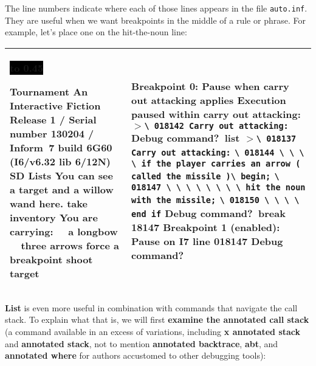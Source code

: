 \documentclass{book}
\newcommand{\n}{\hspace*{\fill}\newline}
\newcommand{\terp}[2]{\begin{center}\begin{tabular}{p{0.45\textwidth}|p{0.45\textwidth}}\midrule #1&#2\\\midrule\end{tabular}\end{center}}
\newcommand{\glkheading}[1]{\textbf{#1}}
\newcommand{\glkinput}[1]{\textbf{#1}}
\newcommand{\glkstatusline}[2]{\centerline{\colorbox{black}{\hbox to 0.45\textwidth{\textcolor{white}{#1\hfil #2}}}}}
\newcommand{\storyprompt}{\raisebox{1.5pt}{\(>\)}}
\newcommand{\cursor}{\raisebox{-1.5pt}{\RectangleThin}}
\newcommand{\markedindent}{\(>\)}
\newcommand{\unmarkedindent}{\hphantom{\(>\)}}
\begin{document}
The line numbers indicate where each of those lines appears in the file
\texttt{auto.inf}.  They are useful when we want breakpoints in the middle of a
rule or phrase.  For example, let's place one on the hit-the-noun line:

\terp{\glkstatusline{Lists}{0/2}\n
  \glkheading{Tournament}\n
  An Interactive Fiction\n
  Release 1 / Serial number 130204 / Inform~7 build 6G60 (I6/v6.32 lib 6/12N) SD\n
  \n
  \glkheading{Lists}\n
  You can see a target and a willow wand here.\n
  \n
  \storyprompt\glkinput{take inventory}\n
  You are carrying:\n
  \null\ \ a longbow\n
  \null\ \ three arrows\n
  \n
  \storyprompt\glkinput{force a breakpoint}\n
  \storyprompt\glkinput{shoot target}}{%
  \glkheading{Breakpoint 0:} Pause when carry out attacking applies\n
  \n
  Execution paused within carry out attacking:\n
  \markedindent \lstinline{\ 018142 Carry out attacking:}\n
  \n
  Debug command?\ \glkinput{list}\n
  \n
  \markedindent \lstinline{\ 018137 Carry out attacking:}\n
  \unmarkedindent \lstinline{\ 018144 \ \ \ \ if the player carries an arrow ( called the missile )}\lstinline{\ begin;}\n
  \unmarkedindent \lstinline{\ 018147 \ \ \ \ \ \ \ \ hit the noun with the missile;}\n
  \unmarkedindent \lstinline{\ 018150 \ \ \ \ end if}\n
  \n
  Debug command?\ \glkinput{break 18147}\n
  \n
  Breakpoint 1 (enabled): Pause on I7 line 018147\n
  \n
  Debug command?\ \cursor}

\glkinput{List} is even more useful in combination with commands that navigate
the call stack.  To explain what that is, we will first \glkinput{examine the
  annotated call stack} (a command available in an excess of variations,
including \glkinput{x annotated stack} and \glkinput{annotated stack}, not to
mention \glkinput{annotated backtrace}, \glkinput{abt}, and \glkinput{annotated
  where} for authors accustomed to other debugging tools):
\end{document}
